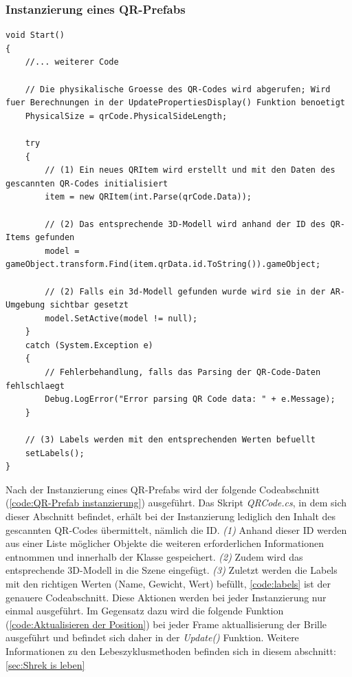 \begin{itemize}
\subsubsection*{Instanzierung eines QR-Prefabs}

\begin{lstlisting}[style=csharp, caption={Instanzierung eines QR-Prefabs}, label=code:QR-Prefab instanzierung]
void Start()
{
    //... weiterer Code

    // Die physikalische Groesse des QR-Codes wird abgerufen; Wird fuer Berechnungen in der UpdatePropertiesDisplay() Funktion benoetigt
    PhysicalSize = qrCode.PhysicalSideLength;

    try
    {
        // (1) Ein neues QRItem wird erstellt und mit den Daten des gescannten QR-Codes initialisiert
        item = new QRItem(int.Parse(qrCode.Data));

        // (2) Das entsprechende 3D-Modell wird anhand der ID des QR-Items gefunden
        model = gameObject.transform.Find(item.qrData.id.ToString()).gameObject;

        // (2) Falls ein 3d-Modell gefunden wurde wird sie in der AR-Umgebung sichtbar gesetzt
        model.SetActive(model != null);
    }
    catch (System.Exception e)
    {
        // Fehlerbehandlung, falls das Parsing der QR-Code-Daten fehlschlaegt
        Debug.LogError("Error parsing QR Code data: " + e.Message);
    }

    // (3) Labels werden mit den entsprechenden Werten befuellt
    setLabels();
}
\end{lstlisting}

Nach der Instanzierung eines QR-Prefabs wird der folgende Codeabschnitt (\ref{code:QR-Prefab instanzierung}) ausgeführt. Das Skript \textit{QRCode.cs}, in dem sich dieser Abschnitt befindet, erhält bei der Instanzierung lediglich den Inhalt des gescannten QR-Codes übermittelt, nämlich die ID. \textit{(1)} Anhand dieser ID werden aus einer Liste möglicher Objekte die weiteren erforderlichen Informationen entnommen und innerhalb der Klasse gespeichert. \textit{(2)} Zudem wird das entsprechende 3D-Modell in die Szene eingefügt. \textit{(3)} Zuletzt werden die Labels mit den richtigen Werten (Name, Gewicht, Wert) befüllt, \ref{code:labels} ist der genauere Codeabschnitt. Diese Aktionen werden bei jeder Instanzierung nur einmal ausgeführt. Im Gegensatz dazu wird die folgende Funktion (\ref{code:Aktualisieren der Position}) bei jeder Frame aktuallisierung der Brille ausgeführt und befindet sich daher in der \textit{Update()} Funktion. Weitere Informationen zu den Lebeszyklusmethoden befinden sich in diesem abschnitt: \ref{sec:Shrek is leben}


\end{itemize}
